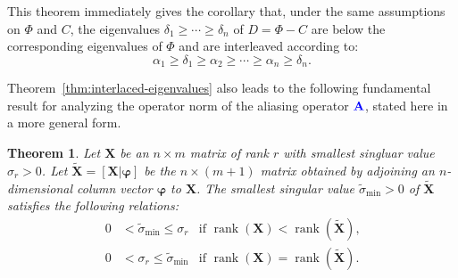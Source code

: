 \documentclass[twocolumn,aps,prx,superscriptaddress,10pt]{revtex4-2}
\newcommand{\0}{\bm{0}}
\newcommand{\bphi}{\boldsymbol{\varphi}}
\newcommand{\bbA}{{\color{blue}{\mathbf{A}}}}  %
\newcommand{\bbX}{\mathbf{X}}
\DeclareMathOperator{\rank}{rank}
\newtheorem{theorem}{Theorem}[section]
\begin{document}
This theorem immediately gives the corollary that, under the same assumptions on $\Phi$ and $C$, the eigenvalues $\delta_1 \ge \cdots \ge \delta_n$ of $D = \Phi - C$ are below the corresponding eigenvalues of $\Phi$ and are interleaved according to:
\[
\alpha_1 \ge \delta_1 \ge \alpha_2 \ge \cdots  \ge \alpha_n \ge \delta_n.
\]

Theorem~\ref{thm:interlaced-eigenvalues} also leads to the following fundamental result for analyzing the operator norm of the aliasing operator $\bbA$, stated here in a more general form. 
\begin{theorem}\label{thm:add-column-inverse-norm}
Let $\bbX$ be an $n\times m$ matrix of rank $r$ with smallest  singluar value $\sigma_r>0$.  Let $\widetilde{\bbX} = [\bbX | \bphi]$ be the $n\times (m+1)$ matrix obtained by adjoining an $n$-dimensional column vector $\bphi$ to $\bbX$.  The smallest singular value $\widetilde{\sigma}_{\mathrm{min}}>0$ of $\widetilde{\bbX}$ satisfies the following relations:
\begin{align*}
0 & < \widetilde{\sigma}_{\mathrm{min}} \le \sigma_r  & 
\text{if $\rank(\bbX) < \rank(\widetilde{\bbX})$,}\\
0 & < {\sigma}_r \le \widetilde{\sigma}_{\mathrm{min}}  & \text{if $\rank(\bbX) = \rank(\widetilde{\bbX})$.}
\end{align*}
\end{theorem}
\end{document}
